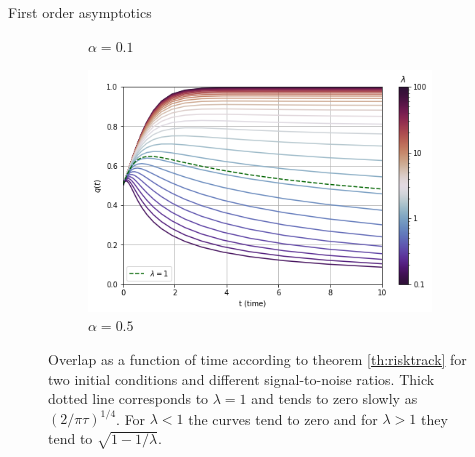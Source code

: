 \documentclass[10pt]{beamer}
\begin{document}
\begin{frame}{First order asymptotics}
\begin{figure}
\begin{subfigure}{0.48\linewidth}
        \caption{$\alpha = 0.1$}
    \end{subfigure}
    \hfill
    \begin{subfigure}{0.48\linewidth}
        \includegraphics[width=\textwidth]{./images/experiment_3.png}
        \caption{$\alpha = 0.5$}
    \end{subfigure}
    \caption{Overlap as a function of time according to theorem \ref{th:risktrack} for two initial conditions and different 
    signal-to-noise ratios. Thick dotted line corresponds to $\lambda =1$ and tends to zero slowly as $(2/\pi\tau)^{1/4}$. For $\lambda <1$ the curves tend to zero and for $\lambda >1$ they tend to $\sqrt{1 - 1/\lambda}$. }
    \label{fig:theoretical_curves}
\end{figure}
\end{frame}
\end{document}
